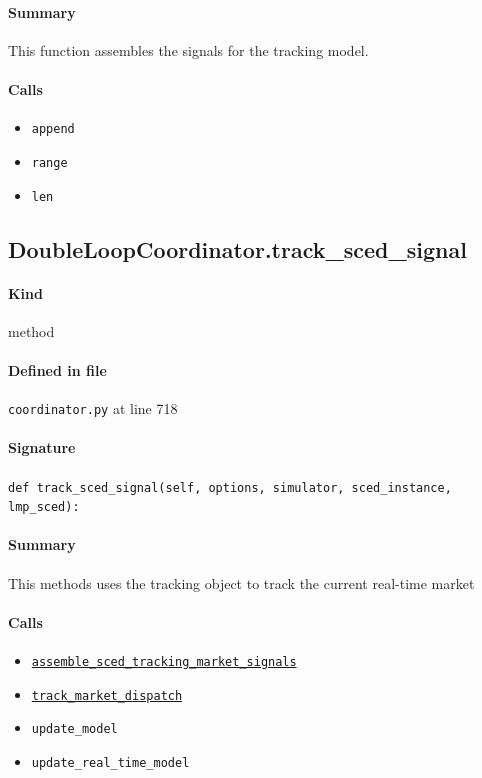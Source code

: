 \documentclass[11pt]{report}
\begin{document}
\paragraph{Summary} This function assembles the signals for the tracking model.
\paragraph{Calls}
\begin{itemize}[leftmargin=*]
  \item \texttt{append}
  \item \texttt{range}
  \item \texttt{len}
\end{itemize}
\subsection{DoubleLoopCoordinator.track\_sced\_signal}
\label{def:coordinator.py:DoubleLoopCoordinator.track_sced_signal:L718}
\paragraph{Kind} method
\paragraph{Defined in file} \texttt{coordinator.py} at line 718
\paragraph{Signature} \texttt{def track\_sced\_signal(self, options, simulator, sced\_instance, lmp\_sced):}
\paragraph{Summary} This methods uses the tracking object to track the current real-time market
\paragraph{Calls}
\begin{itemize}[leftmargin=*]
  \item \hyperref[def:coordinator.py:DoubleLoopCoordinator.assemble_sced_tracking_market_signals:L648]{\texttt{assemble\_sced\_tracking\_market\_signals}}
  \item \hyperref[def:tracker.py:Tracker.track_market_dispatch:L283]{\texttt{track\_market\_dispatch}}
  \item \texttt{update\_model}
  \item \texttt{update\_real\_time\_model}
\end{itemize}
\end{document}
